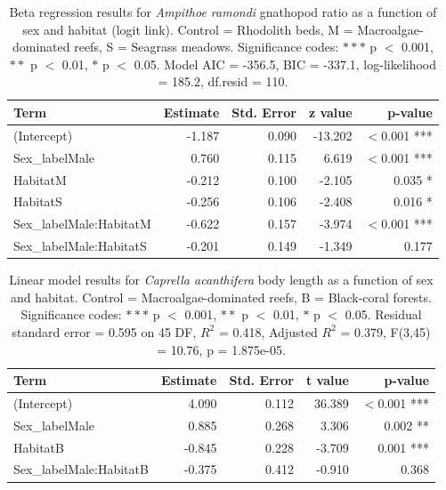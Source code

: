 \documentclass[journal,article,submit,pdftex,moreauthors]{Definitions/mdpi}
\begin{document}
\begin{table}[H]
\caption{Beta regression results for \textit{Ampithoe ramondi} gnathopod ratio as a function of sex and habitat (logit link). Control = Rhodolith beds, M = Macroalgae-dominated reefs, S = Seagrass meadows. Significance codes: $***$ p $<$ 0.001, $**$ p $<$ 0.01, $*$ p $<$ 0.05. Model AIC = -356.5, BIC = -337.1, log-likelihood = 185.2, df.resid = 110.\label{tab:supp_tableA3}}
\centering
\begin{tabularx}{\textwidth}{l r r r r}
\toprule
Term & Estimate & Std. Error & z value & p-value \\
\midrule
(Intercept) & -1.187 & 0.090 & -13.202 & $<$0.001 *** \\
Sex\_labelMale & 0.760 & 0.115 & 6.619 & $<$0.001 *** \\
HabitatM & -0.212 & 0.100 & -2.105 & 0.035 * \\
HabitatS & -0.256 & 0.106 & -2.408 & 0.016 * \\
Sex\_labelMale:HabitatM & -0.622 & 0.157 & -3.974 & $<$0.001 *** \\
Sex\_labelMale:HabitatS & -0.201 & 0.149 & -1.349 & 0.177 \\
\bottomrule
\end{tabularx}
\end{table}

\begin{table}[H]
\caption{Linear model results for \textit{Caprella acanthifera} body length as a function of sex and habitat. Control = Macroalgae-dominated reefs, B = Black-coral forests. Significance codes: $***$ p $<$ 0.001, $**$ p $<$ 0.01, $*$ p $<$ 0.05. Residual standard error = 0.595 on 45 DF, $R^2$ = 0.418, Adjusted $R^2$ = 0.379, F(3,45) = 10.76, p = 1.875e-05.\label{tab:supp_tableA4}}
\centering
\begin{tabularx}{\textwidth}{l r r r r}
\toprule
Term & Estimate & Std. Error & t value & p-value \\
\midrule
(Intercept) & 4.090 & 0.112 & 36.389 & $<$0.001 *** \\
Sex\_labelMale & 0.885 & 0.268 & 3.306 & 0.002 ** \\
HabitatB & -0.845 & 0.228 & -3.709 & 0.001 *** \\
Sex\_labelMale:HabitatB & -0.375 & 0.412 & -0.910 & 0.368 \\
\bottomrule
\end{tabularx}
\end{table}
\end{document}
